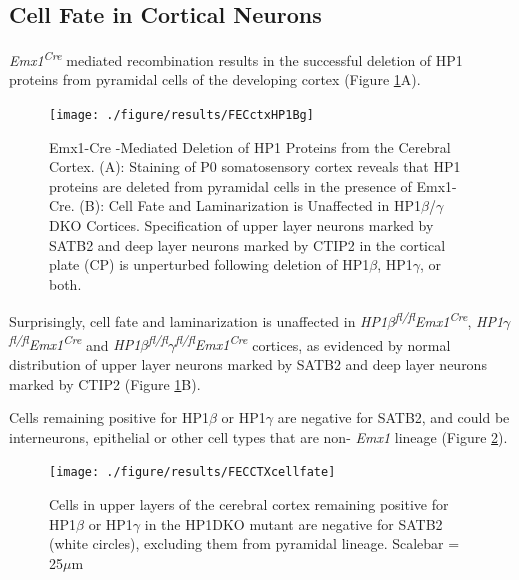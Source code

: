 \documentclass[onehalf,12pt]{beavtex}
\begin{document}
  \subsection{Cell Fate in Cortical
  Neurons}\label{cell-fate-in-cortical-neurons}
  
  \emph{Emx1\textsuperscript{Cre}} mediated recombination results in the
  successful deletion of HP1 proteins from pyramidal cells of the
  developing cortex (Figure \ref{fig:FECctx}A).
  
  \begin{figure}
  
  {\centering \texttt{[image: ./figure/results/FECctxHP1Bg]} 
  
  }
  
  \caption[Emx1-Cre -Mediated Deletion of HP1 Proteins from the Cerebral Cortex.]{Emx1-Cre -Mediated Deletion of HP1 Proteins from the Cerebral Cortex.  (A): Staining of P0 somatosensory cortex reveals that HP1 proteins are deleted from pyramidal cells in the presence of Emx1-Cre. (B): Cell Fate and Laminarization is Unaffected in HP1$\beta$/$\gamma$ DKO Cortices. Specification of upper layer neurons marked by SATB2 and deep layer neurons marked by CTIP2 in the cortical plate (CP) is unperturbed following deletion of HP1$\beta$, HP1$\gamma$, or both.}\label{fig:FECctx}
  \end{figure}
  
  Surprisingly, cell fate and laminarization is unaffected in
  \emph{HP1\(\beta\)\textsuperscript{fl/fl}Emx1\textsuperscript{Cre}},
  \emph{HP1\(\gamma\)\textsuperscript{fl/fl}Emx1\textsuperscript{Cre}} and
  \emph{HP1\(\beta\)\textsuperscript{fl/fl}\(\gamma\)\textsuperscript{fl/fl}Emx1\textsuperscript{Cre}}
  cortices, as evidenced by normal distribution of upper layer neurons
  marked by SATB2 and deep layer neurons marked by CTIP2 (Figure
  \ref{fig:FECctx}B).
  
  Cells remaining positive for HP1\(\beta\) or HP1\(\gamma\) are negative
  for SATB2, and could be interneurons, epithelial or other cell types
  that are non- \emph{Emx1} lineage (Figure \ref{fig:Satb2exclude}).
  
  \begin{figure}
  
  {\centering \texttt{[image: ./figure/results/FECCTXcellfate]} 
  
  }
  
  \caption[Cells remaining positive for HP1 in HP1DKO cortex are of non-pyramidal lineage]{Cells in upper layers of the cerebral cortex remaining positive for HP1$\beta$ or HP1$\gamma$ in the HP1DKO mutant are negative for SATB2 (white circles), excluding them from pyramidal lineage. Scalebar = 25$\mu$m}\label{fig:Satb2exclude}
  \end{figure}
  
\end{document}
